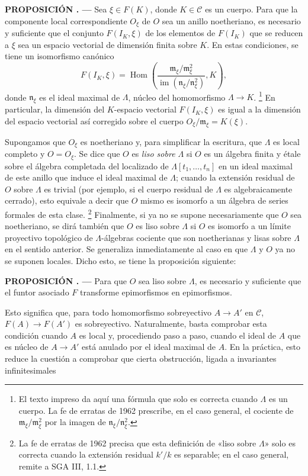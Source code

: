 \documentclass[11pt,twoside,openany]{book}
\numberwithin{equation}{section}
\theoremstyle{plain}
\theoremstyle{definition}
\theoremstyle{remark}
\newcommand{\result}[2]{%
  \par\medskip\noindent\textbf{#1%
  \if\relax\detokenize{#2}\relax\else\space#2\fi. ---}\enspace
}
\theoremstyle{plain}
\theoremstyle{definition}
\theoremstyle{remark}
\begin{document}
\result{PROPOSICIÓN}{5.1} Sea $\xi\in F(K)$, donde $K\in\mathcal C$ es un
cuerpo. Para que la componente local correspondiente $O_\xi$ de $O$ sea un
anillo noetheriano, es necesario y suficiente que el conjunto $F(I_K,\xi)$ de
los elementos de $F(I_K)$ que se reducen a $\xi$ sea un espacio vectorial
de dimensión finita sobre $K$. En estas condiciones, se tiene un isomorfismo
canónico
\[
  F(I_K,\xi)=
  \operatorname{Hom}\!\left(
    \frac{\mathfrak m_\xi/\mathfrak m_\xi^2}
         {\operatorname{im}(\mathfrak n_\xi/\mathfrak n_\xi^2)},K
  \right),
\]
donde $\mathfrak n_\xi$ es el ideal maximal de $\Lambda$, núcleo del
homomorfismo $\Lambda\longrightarrow K$.
\footnote{El texto impreso da aquí una fórmula que solo es correcta cuando
$\Lambda$ es un cuerpo. La fe de erratas de 1962 prescribe, en el caso general,
el cociente de $\mathfrak m_\xi/\mathfrak m_\xi^2$ por la imagen de
$\mathfrak n_\xi/\mathfrak n_\xi^2$.}
En particular, la dimensión del $K$-espacio vectorial $F(I_K,\xi)$ es igual a
la dimensión del espacio vectorial así corregido sobre el cuerpo
$O_\xi/\mathfrak m_\xi=K(\xi)$.

Supongamos que $O_\xi$ es noetheriano y, para simplificar la escritura, que
$\Lambda$ es local completo y $O=O_\xi$. Se dice que $O$ es \emph{liso sobre
$\Lambda$} si $O$ es un álgebra finita y étale sobre el álgebra completada del
localizado de $\Lambda[t_1,\ldots,t_n]$ en un ideal maximal de este anillo que
induce el ideal maximal de $\Lambda$; cuando la extensión residual de $O$ sobre
$\Lambda$ es trivial (por ejemplo, si el cuerpo residual de $\Lambda$ es
algebraicamente cerrado), esto equivale a decir que $O$ mismo es isomorfo a un
álgebra de series formales de esta clase.
\footnote{La fe de erratas de 1962 precisa que esta definición de «liso sobre
$\Lambda$» solo es correcta cuando la extensión residual $k'/k$ es separable;
en el caso general, remite a SGA III, 1.1.}
Finalmente, si ya no se supone necesariamente que $O$ sea noetheriano, se dirá
también que $O$ es liso sobre $\Lambda$ si $O$ es isomorfo a un límite
proyectivo topológico de $\Lambda$-álgebras cociente que son noetherianas y
lisas sobre $\Lambda$ en el sentido anterior. Se generaliza inmediatamente al caso
en que $\Lambda$ y $O$ ya no se suponen locales. Dicho esto, se tiene la
proposición siguiente:

\result{PROPOSICIÓN}{5.2} Para que $O$ sea liso sobre $\Lambda$, es necesario
y suficiente que el funtor asociado $F$ transforme epimorfismos en
epimorfismos.

Esto significa que, para todo homomorfismo sobreyectivo
$A\longrightarrow A'$ en $\mathcal C$, $F(A)\longrightarrow F(A')$ es
sobreyectivo. Naturalmente, basta comprobar esta condición cuando $A$ es local
y, procediendo paso a paso, cuando el ideal de $A$ que es núcleo de
$A\longrightarrow A'$ está anulado por el ideal maximal de $A$. En la práctica,
esto reduce la cuestión a comprobar que cierta obstrucción, ligada a invariantes
infinitesimales
\end{document}
